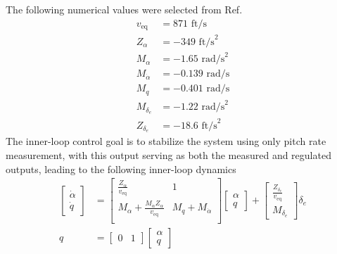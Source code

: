 The following numerical values were selected from Ref.\ \cite{heffley.nasacr2144.1972, nelson.flightcontrol.1998}
\begin{equation*}
  \begin{aligned}
    v_{\text{eq}} &= 871 \text{~ft/s} \\
    Z_{\alpha} &= -349 \text{~ft/s}^{2} \\
    M_{\alpha} &= -1.65 \text{~rad/s}^{2} \\
    M_{\dot{\alpha}} &= -0.139 \text{~rad/s} \\
    M_{q} &= -0.401 \text{~rad/s} \\
    M_{\delta_{e}} &= -1.22 \text{~rad/s}^{2} \\
    Z_{\delta_{e}} &= -18.6 \text{~ft/s}^{2}
  \end{aligned}
\end{equation*}
The inner-loop control goal is to stabilize the system using only pitch rate measurement, with this output serving as both the measured and regulated outputs, leading to the following inner-loop dynamics
\begin{equation}
  \label{eqn.transportAircraftInnerLoop}
  \begin{split}
    \begin{bmatrix}
      \dot{\alpha} \\
      \dot{q}
    \end{bmatrix}
    &=
    \begin{bmatrix}
      \frac{Z_{\alpha}}{v_{\text{eq}}} & 1 \\
      M_{\alpha}+\frac{M_{\dot{\alpha}}Z_{\alpha}}{v_{\text{eq}}} & M_{q}+M_{\dot{\alpha}} \\
    \end{bmatrix}
    \begin{bmatrix}
    \alpha \\
    q
    \end{bmatrix}+
    \begin{bmatrix}
      \frac{Z_{\delta_{e}}}{v_{\text{eq}}} \\
      M_{\delta_{e}}
    \end{bmatrix}
    \delta_{e} \\
    q &=
    \begin{bmatrix}
      0 & 1
    \end{bmatrix}
    \begin{bmatrix}
    \alpha \\
    q
    \end{bmatrix}
  \end{split}
\end{equation}
